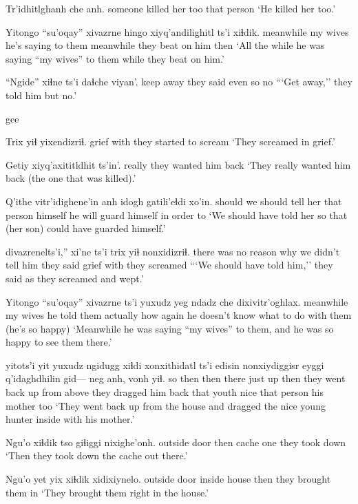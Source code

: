 \documentclass[12pt]{article}
\begin{document}
\gll Tr'idhitlghanh che anh.
{someone killed her} too {that person}
\glt `He killed her too.'
\glend

\gll Yitongo ``su'oqay'' xivazrne hingo xiyq'andilighitl ts'i xiɬdik.
meanwhile {my wives} {he's saying to them} meanwhile {they beat on him} {} then
\glt `All the while he was saying ``my wives'' to them while they beat on him.'
\glend

\gll ``Ngide'' xiɬne ts'i daɬche viyan'.
{keep away} {they said} {} {even so} no
\glt ```Get away,'' they told him but no.'
\glend

gee

\gll Trix yiɬ yixendizriɬ.
grief with {they started to scream}
\glt `They screamed in grief.'
\glend

\gll Getiy xiyq'axititldhit ts'in'.
really {they wanted him back} {}
\glt `They really wanted him back (the one that was killed).'
\glend

\gll Q'ithe vitr'idighene'in anh idogh gatili'eɬdi xo'in.
should {we should tell her} {that person} himself {he will guard himself} {in order to} 
\glt `We should have told her so that (her son) could have guarded himself.'
\glend

 divazrenelts'i,'' xi'ne ts'i trix yiɬ nonxidizriɬ.
{there was no reason why} {we didn't tell him} {they said} {} grief with {they screamed}
\glt ```We should have told him,'' they said as they screamed and wept.'
\glend

\gll Yitongo ``su'oqay'' xivazrne ts'i {yuxudz yeg} ndadz che dixivitr'oghlax.
meanwhile {my wives} {he told them} {} actually how again  {he doesn't know what to do with them (he's so happy)}
\glt `Meanwhile he was saying ``my wives'' to them, and he was so happy to see them there.'
\glend

 yitots'i yit yuxudz ngidugg xiɬdi xonxithidatl ts'i edisin nonxiydiggisr eyggi q'idaghdhilin gid--- neg anh, vonh yiɬ.
{so then } then there just up then {they went back up} {} {from above} {they dragged him back} that youth {} nice {that person} {his mother} too
\glt `They went back up from the house and dragged the nice young hunter inside with his mother.'
\glend

\gll Ngu'o xiɬdik tso giɬiggi nixighe'onh. 
{outside door} then cache one {they took down}
\glt `Then they took down the cache out there.'
\glend

\gll Ngu'o yet yix xiɬdik xidixiynelo.
{outside door} inside house then {they brought them in}
\glt `They brought them right in the house.'
\glend
\end{document}

